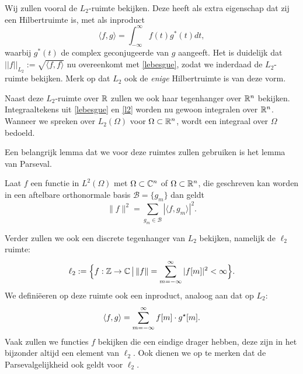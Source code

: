 Wij zullen vooral de $L_2$-ruimte bekijken. Deze heeft als extra eigenschap dat zij een Hilbertruimte is, 
met als inproduct
\begin{equation}
	\label{l2}
	\langle f, g \rangle = \int_{-\infty}^\infty f(t) g^*(t) dt,
\end{equation}
waarbij $g^*(t)$ de complex geconjugeerde van $g$ aangeeft.
Het is duidelijk dat $ || f ||_{L_2} := \sqrt{\langle f, f \rangle}$ nu overeenkomt met \eqref{lebesgue}, zodat we inderdaad de $L_2$-ruimte bekijken. Merk op dat $L_2$ ook de \emph{enige} Hilbertruimte is van deze vorm.

Naast deze $L_2$-ruimte over $\mathbb{R}$ zullen we ook haar tegenhanger over $\mathbb{R}^n$ bekijken. Integraaltekens uit \eqref{lebesgue} en \eqref{l2} worden nu gewoon integralen over $\mathbb{R}^n$. Wanneer we spreken over $L_2(\Omega)$ voor $\Omega \subset \mathbb{R}^n$, wordt een integraal over $\Omega$ bedoeld.

Een belangrijk lemma dat we voor deze ruimtes zullen gebruiken is het lemma van Parseval.
\begin{lemm}
  \label{parseval}
  Laat $f$ een functie in $L^2(\Omega)$ met $\Omega \subset \mathbb{C}^n$ of $\Omega\subset\mathbb{R}^n$, die geschreven kan worden in een aftelbare 
  orthonormale basis $\mathcal{B}=\{g_m\}$ dan geldt
  \[
  \|f\|^2 = \sum_{g_m\in\mathcal{B}} | \langle f, g_m \rangle |^2.
  \]
\end{lemm}

Verder zullen we ook een discrete tegenhanger van $L_2$ bekijken, namelijk de $\ell_2$ ruimte:
\[
\ell_2 :=\Big \{f:\mathbb{Z} \to \mathbb{C} \,\big|\, \|f\| = \sum_{m=-\infty}^\infty |f[m]|^2 < \infty \Big \}.
\]
We defini\"eeren op deze ruimte ook een inproduct, analoog aan dat op $L_2$:
\[
\langle f , g \rangle = \sum_{m=-\infty}^\infty f[m]\cdot g^\star[m].
\]
Vaak zullen we functies $f$ bekijken die een eindige drager hebben, deze zijn in het bijzonder altijd een element
van $\ell_2$. Ook dienen we op te merken dat de Parsevalgelijkheid ook geldt voor $\ell_2$.
 

